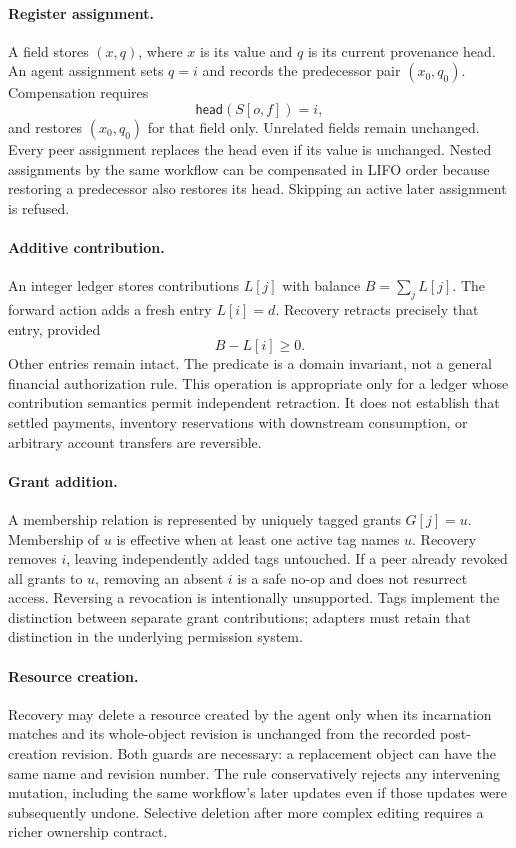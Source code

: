 \documentclass[10pt,twocolumn]{article}
\newcommand{\head}{\mathsf{head}}
\begin{document}
\paragraph{Register assignment.}
A field stores $(x,q)$, where $x$ is its value and $q$ is its current provenance head. An agent assignment sets $q=i$ and records the predecessor pair $(x_0,q_0)$. Compensation requires
\begin{equation}
 \head(S[o,f])=i,
\end{equation}
and restores $(x_0,q_0)$ for that field only. Unrelated fields remain unchanged. Every peer assignment replaces the head even if its value is unchanged. Nested assignments by the same workflow can be compensated in LIFO order because restoring a predecessor also restores its head. Skipping an active later assignment is refused.

\paragraph{Additive contribution.}
An integer ledger stores contributions $L[j]$ with balance $B=\sum_j L[j]$. The forward action adds a fresh entry $L[i]=d$. Recovery retracts precisely that entry, provided
\begin{equation}
 B-L[i]\geq 0.
\end{equation}
Other entries remain intact. The predicate is a domain invariant, not a general financial authorization rule. This operation is appropriate only for a ledger whose contribution semantics permit independent retraction. It does not establish that settled payments, inventory reservations with downstream consumption, or arbitrary account transfers are reversible.

\paragraph{Grant addition.}
A membership relation is represented by uniquely tagged grants $G[j]=u$. Membership of $u$ is effective when at least one active tag names $u$. Recovery removes $i$, leaving independently added tags untouched. If a peer already revoked all grants to $u$, removing an absent $i$ is a safe no-op and does not resurrect access. Reversing a revocation is intentionally unsupported. Tags implement the distinction between separate grant contributions; adapters must retain that distinction in the underlying permission system.

\paragraph{Resource creation.}
Recovery may delete a resource created by the agent only when its incarnation matches and its whole-object revision is unchanged from the recorded post-creation revision. Both guards are necessary: a replacement object can have the same name and revision number. The rule conservatively rejects any intervening mutation, including the same workflow's later updates even if those updates were subsequently undone. Selective deletion after more complex editing requires a richer ownership contract.
\end{document}
